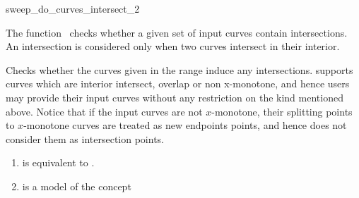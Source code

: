 

\begin{ccRefFunction}{sweep_do_curves_intersect_2} %


\ccDefinition
  
The function \ccRefName\ checks whether a given set of input curves 
contain intersections. An intersection is considered only when 
two curves intersect in their interior. 


   {Checks whether the curves given in the range 
   \ccStyle{[curves_begin, curves_end)} induce any intersections.
    supports
   curves which are interior intersect, overlap or non x-monotone, and
   hence users may provide their input curves without any
   restriction on the kind mentioned above. 
   Notice that if the input curves are not $x$-monotone, their splitting points 
   to $x$-monotone curves are treated as new endpoints points, and hence 
    does not consider them as intersection points.}

\begin{enumerate}
   \item    {} is equivalent to .
   \item    {} is a model of the  concept
\end{enumerate}


\ccSeeAlso
{} \\
 \\
 \\


\end{ccRefFunction}
